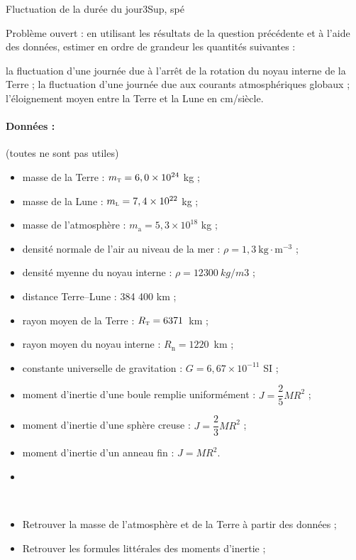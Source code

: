 \begin{exercise}{Fluctuation de la durée du jour}{3}{Sup, spé}
\begin{questions}
{\textsf{Problème ouvert :} en utilisant les résultats de la question précédente et à l'aide des données, estimer en ordre de grandeur les quantités suivantes :
}

    \question la fluctuation d'une journée due à l'arrêt de la rotation du noyau interne de la Terre ;
    \question la fluctuation d'une journée due aux courants atmosphériques globaux ;
    \question l'éloignement moyen entre la Terre et la Lune en cm/siècle.
\end{questions}

\paragraph{Données :}(toutes ne sont pas utiles)\\[-2em]
\begin{multicols}{2}
\begin{itemize}
    \item masse de la Terre : $m_\textsc{t} = 6,0\times 10^{24}$ kg ;
    \item masse de la Lune : $m_\textsc{l} = 7,4\times 10^{22}$ kg ;
    \item masse de l'atmosphère : $m_\text{a} = 5,3\times 10^{18}$ kg ;
    \item densité normale de l'air au niveau de la mer : $\rho = 1,3\ \mathrm{kg\cdot m^{-3}}$ ;
    \item densité myenne du noyau interne : $\rho = \SI{12 300}{kg/m3}$ ;
    \item distance Terre--Lune : 384 400 km ;
    \item rayon moyen de la Terre : $R_\textsc{t} = 6371$~km ; 
    \item rayon moyen du noyau interne : $R_\text{n} = 1220$~km ;
    \item constante universelle de gravitation : $G = 6,67\times 10^{-11}$ SI ;
    \item moment d'inertie d'une boule remplie uniformément : $J=\dfrac{2}{5}MR^2$ ;
    \item moment d'inertie d'une sphère creuse : $J=\dfrac{2}{3}MR^2$ ;
    \item moment d'inertie d'un anneau fin : $J =MR^2$.
    \item
\end{itemize}
\end{multicols}
\end{exercise}

\begin{solution}

\plusloin~\\[-2em]
\begin{itemize}
    \item Retrouver la masse de l'atmosphère et de la Terre à partir des données ;
    \item Retrouver les formules littérales des moments d'inertie ;
\end{itemize}

\end{solution}